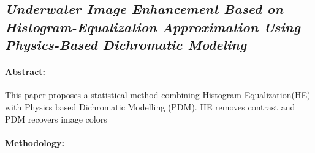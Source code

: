 \subsection{\textit{Underwater Image Enhancement Based on Histogram-Equalization Approximation Using Physics-Based Dichromatic Modeling\cite{Peng_2022}}}

\paragraph{Abstract:}
This paper proposes a statistical method combining Histogram Equalization(HE) with Physics based Dichromatic Modelling (PDM). HE removes contrast and PDM recovers image colors

\paragraph{Methodology:}
